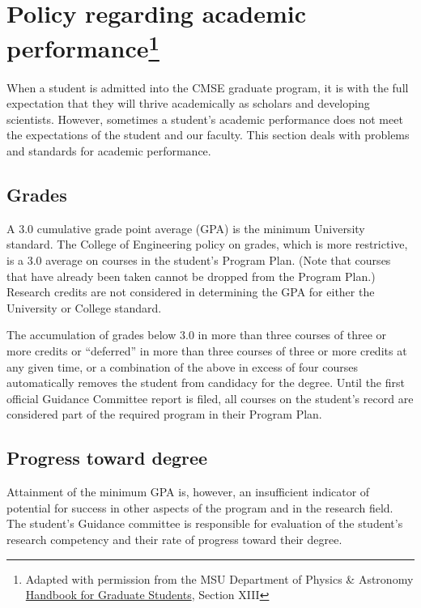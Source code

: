 \section[Policy regarding academic performance]{Policy regarding
  academic performance\footnote{Adapted with permission from the MSU
    Department of Physics \& Astronomy
    \href{https://www.pa.msu.edu/grad/GradHandbook_Aug2015.pdf}{Handbook
      for Graduate
      Students}, Section XIII}}

When a student is admitted into the CMSE graduate program, it is with
the full expectation that they will thrive academically as scholars
and developing scientists. However, sometimes a student's academic
performance does not meet the expectations of the student and our
faculty.  This section deals with problems and standards for academic
performance.

\subsection{Grades}

A 3.0 cumulative grade point average (GPA) is the minimum University
standard.  The College of Engineering policy on grades, which is more
restrictive, is a 3.0 average on courses in the student's Program
Plan.  (Note that courses that have already been taken cannot be
dropped from the Program Plan.)  Research credits are not considered in determining the
GPA for either the University or College standard. 

The accumulation of grades below 3.0 in more than three courses of
three or more credits or ``deferred'' in more than three courses of
three or more credits at any given time, or a combination of the above
in excess of four courses automatically removes the student from
candidacy for the degree. Until the first official Guidance Committee
report is filed, all courses on the student's record are considered
part of the required program in their Program Plan.

\subsection{Progress toward degree}

Attainment of the minimum GPA is, however, an insufficient
indicator of potential for success in other aspects of the program and
in the research field. The student's Guidance committee is responsible
for evaluation of the student's research competency and their rate of
progress toward their degree. 

